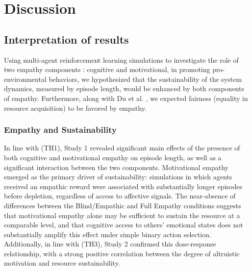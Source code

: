 \section{Discussion}
\subsection{Interpretation of results}

Using multi-agent reinforcement learning simulations to investigate the role of two empathy components : cognitive and motivational, in promoting pro-environmental behaviors, we hypothesized that the sustainability of the system dynamics, measured by episode length, would be enhanced by both components of empathy. Furthermore, along with Du et al. \cite{du_2024}, we expected fairness (equality in resource acquisition) to be favored by empathy.

\subsubsection{Empathy and Sustainability}
In line with (TH1), Study 1 revealed significant main effects of the presence of both cognitive and motivational empathy on episode length, as well as a significant interaction between the two components. Motivational empathy emerged as the primary driver of sustainability: simulations in which agents received an empathic reward were associated with substantially longer episodes before depletion, regardless of access to affective signals. The near-absence of differences between the Blind/Empathic and Full Empathy conditions suggests that motivational empathy alone may be sufficient to sustain the resource at a comparable level, and that cognitive access to others' emotional states does not substantially amplify this effect under simple binary action selection. Additionally, in line with (TH3), Study 2 confirmed this dose-response relationship, with a strong positive correlation between the degree of altruistic motivation and resource sustainability.

